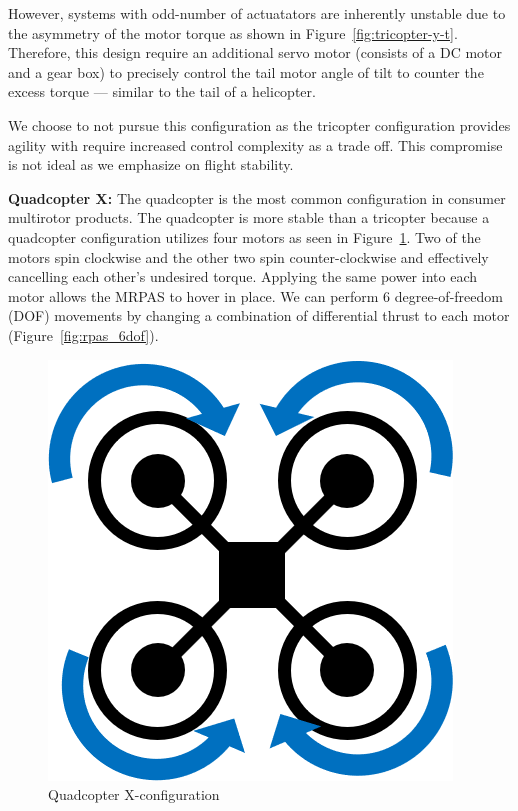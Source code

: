 However, systems with odd-number of actuatators are inherently unstable due to the asymmetry of the motor torque as shown in Figure~\ref{fig:tricopter-y-t}. Therefore, this design require an additional servo motor (consists of a DC motor and a gear box) to precisely control the tail motor angle of tilt to counter the excess torque --- similar to the tail of a helicopter.

We choose to not pursue this configuration as the tricopter configuration provides agility with require increased control complexity as a trade off. This compromise is not ideal as we emphasize on flight stability.

\textbf{Quadcopter X:}
The quadcopter is the most common configuration in consumer multirotor products. The quadcopter is more stable than a tricopter because a quadcopter configuration utilizes four motors as seen in Figure~\ref{fig:quadcopter-x-t}. Two of the motors spin clockwise and the other two spin counter-clockwise and effectively cancelling each other’s undesired torque. Applying the same power into each motor allows the MRPAS to hover in place. We can perform 6 degree-of-freedom (DOF) movements by changing a combination of differential thrust to each motor (Figure~\ref{fig:rpas_6dof}).

\begin{figure}[h]
    \centering
    \includegraphics[scale=0.4]{img/drone_xconfigt}
    \caption{Quadcopter X-configuration}
    \label{fig:quadcopter-x-t}
\end{figure}

